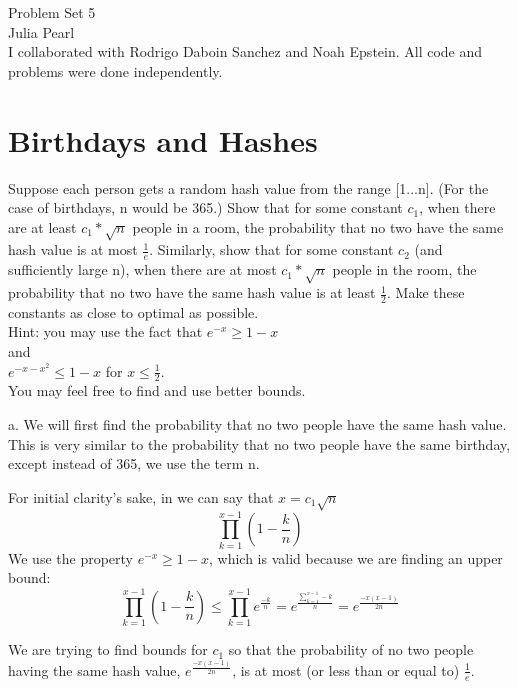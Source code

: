 \documentclass[11pt, solution, letterpaper]{format}
\begin{document}
Problem Set 5\\
Julia Pearl\\

I collaborated with Rodrigo Daboin Sanchez and Noah Epstein. All code and problems were done independently.
\clearpage
\section{Birthdays and Hashes}
Suppose each person gets a random hash value from the range [1...n]. (For the case of birthdays, n would be
365.) Show that for some constant $c_1$, when there are at least $c_1*\sqrt{n}$ people in a room, the probability that no two have the same hash value is at most $\frac{1}{e}$. Similarly, show that for some constant $c_2$ (and sufficiently large n), when there are at most $c_1*\sqrt{n}$
people in the room, the probability that no two have the same hash value is at least $\frac{1}{2}$. Make these constants as close to optimal as possible.\\ Hint: you may use the fact that
$e^{-x} \geq 1 - x $\\ and\\ $e^{- x - x^2} \leq 1-x$ for $x \leq \frac{1}{2}$.\\ You may feel free to find and use better bounds.

a. We will first find the probability that no two people have the same hash value. This is very similar to the probability that no two people have the same birthday, except instead of 365, we use the term n.

For initial clarity's sake, in we can say that $x = c_1\sqrt{n}$
\begin{equation*}
  \prod_{k=1}^{x - 1} (1 - \frac{k}{n})
\end{equation*}
We use the property $e^{-x} \geq 1 - x $, which is valid because we are finding an upper bound:
\begin{equation*}
  \prod_{k=1}^{x - 1} (1 - \frac{k}{n}) 
  \leq  \prod_{k=1}^{x - 1} e^{\frac{-k}{n}}
  = e^{\frac{\sum_{k=1}^{x - 1} -k}{n}}
  = e^{\frac{-x(x-1)}{2n}}
\end{equation*}

We are trying to find bounds for $c_1$ so that the probability of no two people having the same hash value, $e^{\frac{-x(x-1)}{2n}}$, is at most (or less than or equal to) $\frac{1}{e}$.
\end{document}
